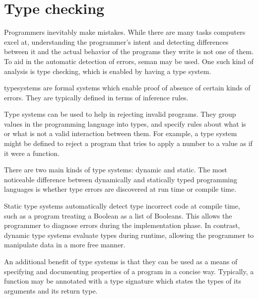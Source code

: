 \section{Type checking}

Programmers inevitably make mistakes. While there are many tasks computers excel at, understanding the programmer's intent and detecting differences between it and the actual behavior of the programs they write is not one of them. To aid in the automatic detection of errors, \gls{seman} may be used. One such kind of analysis is type checking, which is enabled by having a type system.

\Glspl{typesystem} are formal systems which enable proof of absence of certain kinds of errors. They are typically defined in terms of inference rules.

Type systems can be used to help in rejecting invalid programs. They group values in the programming language into types, and specify rules about what is or what is not a valid interaction between them. For example, a type system might be defined to reject a program that tries to apply a number to a value as if it were a function.

There are two main kinds of type systems: dynamic and static. The most noticeable difference between dynamically and statically typed programming languages is whether type errors are discovered at run time or compile time.

Static type systems automatically detect type incorrect code at compile time, such as a program treating a Boolean as a list of Booleans. This allows the programmer to diagnose errors during the implementation phase. In contrast, dynamic type systems evaluate types during runtime, allowing the programmer to manipulate data in a more free manner.

An additional benefit of type systems is that they can be used as a means of specifying and documenting properties of a program in a concise way. Typically, a function may be annotated with a type signature which states the types of its arguments and its return type. 



